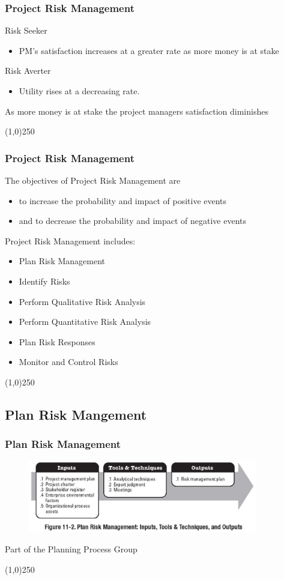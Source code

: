 \begin{frame}
\frametitle{Project Risk Management}
Risk Seeker
\begin{itemize}
	\item PM's satisfaction increases at a greater rate as more money is at stake
\end{itemize}
Risk Averter
\begin{itemize}
	\item Utility rises at a decreasing rate.
\end{itemize}
As more money is at stake the project managers satisfaction diminishes
\end{frame}\begin{center}\line(1,0){250}\end{center}






\begin{frame}
\frametitle{Project Risk Management}
The objectives of Project Risk Management are 
\begin{itemize}
	\item to increase the probability and impact of positive events 
\item and to decrease the probability and impact of negative events
\end{itemize}
Project Risk Management includes:
\begin{itemize}
	\item Plan Risk Management
\item Identify Risks
\item Perform Qualitative Risk Analysis
\item Perform Quantitative Risk Analysis
\item Plan Risk Responses
\item Monitor and Control Risks
\end{itemize}
\end{frame}\begin{center}\line(1,0){250}\end{center}



\subsection{Plan Risk Mangement}


\begin{frame}
\frametitle{Plan Risk Management}
\begin{figure}
	\centering
		\includegraphics[width = 10cm]{images/Fig11-2.jpg}
	\label{fig:11-2}
\end{figure}
Part of the Planning Process Group
\end{frame}\begin{center}\line(1,0){250}\end{center}



